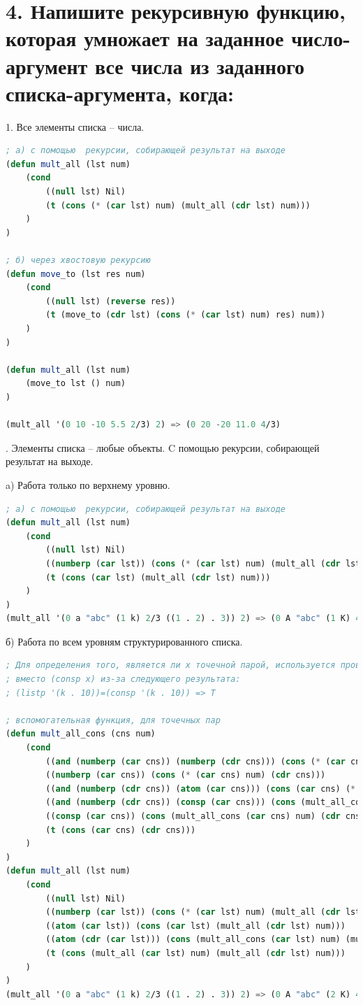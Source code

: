 \documentclass[12pt]{report}
\begin{document}
\section*{4. Напишите рекурсивную функцию, которая умножает на заданное число-аргумент все числа из заданного списка-аргумента, когда:}

1. Все элементы списка -- числа.
\begin{lstlisting}[language=Lisp]
; а) с помощью  рекурсии, собирающей результат на выходе
(defun mult_all (lst num)
	(cond
		((null lst) Nil)
		(t (cons (* (car lst) num) (mult_all (cdr lst) num)))
	)
)

; б) через хвостовую рекурсию
(defun move_to (lst res num)
	(cond
		((null lst) (reverse res))
		(t (move_to (cdr lst) (cons (* (car lst) num) res) num))
	)
)

(defun mult_all (lst num)
	(move_to lst () num)
)

(mult_all '(0 10 -10 5.5 2/3) 2) => (0 20 -20 11.0 4/3)
\end{lstlisting}

. Элементы списка -- любые объекты. C помощью  рекурсии, собирающей результат на выходе. 

a) Работа только по верхнему уровню.
\begin{lstlisting}[language=Lisp]
; а) с помощью  рекурсии, собирающей результат на выходе
(defun mult_all (lst num)
	(cond 
		((null lst) Nil)
		((numberp (car lst)) (cons (* (car lst) num) (mult_all (cdr lst) num)))
		(t (cons (car lst) (mult_all (cdr lst) num)))
	)
)	
(mult_all '(0 a "abc" (1 k) 2/3 ((1 . 2) . 3)) 2) => (0 A "abc" (1 K) 4/3 ((1 . 2) . 3))
\end{lstlisting}

б) Работа по всем уровням структурированного списка.
\begin{lstlisting}[language=Lisp]
; Для определения того, является ли x точечной парой, используется проверка (atom (cdr x)) 
; вместо (consp x) из-за следующего результата:
; (listp '(k . 10))=(consp '(k . 10)) => T

; вспомогательная функция, для точечных пар
(defun mult_all_cons (cns num)
	(cond 
		((and (numberp (car cns)) (numberp (cdr cns))) (cons (* (car cns) num) (* (cdr cns) num)))
		((numberp (car cns)) (cons (* (car cns) num) (cdr cns)))
		((and (numberp (cdr cns)) (atom (car cns))) (cons (car cns) (* (cdr cns) num)))
		((and (numberp (cdr cns)) (consp (car cns))) (cons (mult_all_cons (car cns) num) (* (cdr cns) num)))
		((consp (car cns)) (cons (mult_all_cons (car cns) num) (cdr cns)))
		(t (cons (car cns) (cdr cns)))
	)
)
(defun mult_all (lst num)
	(cond 
		((null lst) Nil)
		((numberp (car lst)) (cons (* (car lst) num) (mult_all (cdr lst) num)))
		((atom (car lst)) (cons (car lst) (mult_all (cdr lst) num)))
		((atom (cdr (car lst))) (cons (mult_all_cons (car lst) num) (mult_all (cdr lst) num)))
		(t (cons (mult_all (car lst) num) (mult_all (cdr lst) num)))
	)
)		
(mult_all '(0 a "abc" (1 k) 2/3 ((1 . 2) . 3)) 2) => (0 A "abc" (2 K) 4/3 ((2 . 4) . 6))
\end{lstlisting}
\end{document}
